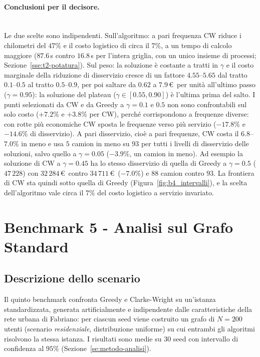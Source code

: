 \paragraph{Conclusioni per il decisore.}\mbox{}\\
Le due scelte sono indipendenti. Sull'algoritmo: a pari frequenza CW riduce i chilometri del $47\%$ e il costo logistico di circa il $7\%$, a un tempo di calcolo maggiore ($87.6$\,s contro $16.8$\,s per l'intera griglia, con un unico insieme di processi; Sezione~\ref{sse:t2-potatura}). Sul peso: la soluzione è costante a tratti in $\gamma$ e il costo marginale della riduzione di disservizio cresce di un fattore $4.55$--$5.65$ dal tratto $0.1$--$0.5$ al tratto $0.5$--$0.9$, per poi saltare da $0.62$ a $7.9$\,\euro\ per unità all'ultimo passo ($\gamma=0.95$): la soluzione del plateau ($\gamma\in[0.55,0.90]$) è l'ultima prima del salto. I punti selezionati da CW e da Greedy a $\gamma=0.1$ e $0.5$ non sono confrontabili sul solo costo ($+7.2\%$ e $+3.8\%$ per CW), perché corrispondono a frequenze diverse: con rotte più economiche CW sposta le frequenze verso più servizio ($-17.8\%$ e $-14.6\%$ di disservizio). A pari disservizio, cioè a pari frequenze, CW costa il $6.8$--$7.0\%$ in meno e usa $5$ camion in meno su $93$ per tutti i livelli di disservizio delle soluzioni, salvo quello a $\gamma=0.05$ ($-3.9\%$, un camion in meno). Ad esempio la soluzione di CW a $\gamma=0.45$ ha lo stesso disservizio di quella di Greedy a $\gamma=0.5$ ($47\,228$) con $32\,284$\,\euro\ contro $34\,711$\,\euro\ ($-7.0\%$) e $88$ camion contro $93$. La frontiera di CW sta quindi sotto quella di Greedy (Figura~\ref{fig:b4_intervalli}), e la scelta dell'algoritmo vale circa il $7\%$ del costo logistico a servizio invariato.


\section{Benchmark 5 - Analisi sul Grafo Standard}\label{se:b5}

\subsection{Descrizione dello scenario}

Il quinto benchmark confronta Greedy e Clarke-Wright su un'istanza standardizzata, generata artificialmente e indipendente dalle caratteristiche della rete urbana di Fabriano: per ciascun seed viene costruito un grafo di $N=200$ utenti (scenario \textit{residenziale}, distribuzione uniforme) su cui entrambi gli algoritmi risolvono la stessa istanza. I risultati sono medie su 30 seed con intervallo di confidenza al $95\%$ (Sezione~\ref{se:metodo-analisi}).

